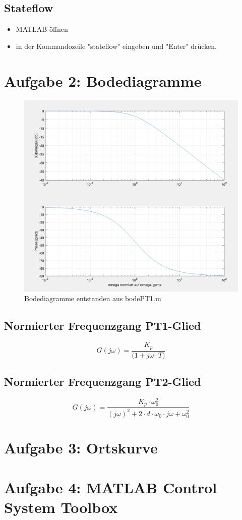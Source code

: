 \documentclass{article}
\begin{document}
		\subsection{Stateflow}
			\begin{itemize}
				\item MATLAB öffnen
				\item in der Kommandozeile "stateflow" eingeben und "Enter" drücken.
			\end{itemize}
		
		
	\newpage	
	\section{Aufgabe 2: Bodediagramme}
		\begin{figure}[h]
 		 	\includegraphics[scale=0.3]{Bodediagramme.png}
			\caption{Bodediagramme entstanden aus bodePT1.m}
			\label{fig1: Bodediagramm1}
		\end{figure}
		
		
		\subsection{Normierter Frequenzgang PT1-Glied}
			\[ G(j\omega) = \frac{K_p}{\Big(1 + j\omega \cdot T\Big)} \]
		\subsection{Normierter Frequenzgang PT2-Glied}
			\[ G(j\omega) = \frac{K_p \cdot \omega_0^2}{(j\omega)^2 + 2\cdot d\cdot \omega_0 \cdot j\omega + \omega_0^2}\]
	\newpage	
	\section{Aufgabe 3: Ortskurve}
	
	\newpage
	\section{Aufgabe 4: MATLAB Control System Toolbox}
	
\end{document}
